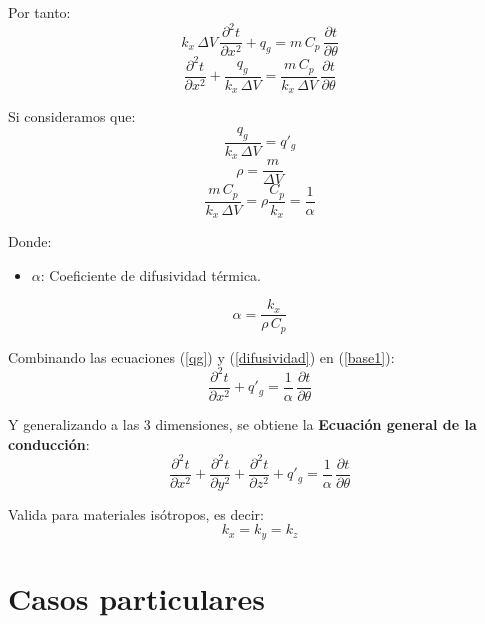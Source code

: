 Por tanto:
\begin{equation*}
    k_x\,\Delta V\,\frac{\partial^{2}t}{\partial x^2}+q_g
    =m\,C_p\,\frac{\partial t}{\partial\theta}
\end{equation*}
\begin{equation}
    \frac{\partial^{2}t}{\partial x^2}+\frac{q_g}{k_x\,\Delta V}
    =\frac{m\,C_p}{k_x\,\Delta V}\,\frac{\partial t}{\partial\theta}
    \label{base1}
\end{equation}

Si consideramos que:
\begin{equation}
    \frac{q_g}{k_x\,\Delta V}=q'_g
    \label{qg}
\end{equation}
\begin{equation*}
    \rho=\frac{m}{\Delta V}
\end{equation*}
\begin{equation}
    \frac{m\,C_p}{k_x\,\Delta V}=\rho\frac{C_p}{k_x}=\frac{1}{\alpha}
    \label{difusividad}
\end{equation}

Donde:
\begin{itemize}
    \item \emph{$\alpha$}: Coeficiente de difusividad térmica.
\end{itemize}

\begin{equation}
    \alpha=\frac{k_x}{\rho\,C_p}
    \label{alpha}
\end{equation}

Combinando las ecuaciones (\ref{qg}) y (\ref{difusividad}) en (\ref{base1}):
\begin{equation}
    \frac{\partial^{2}t}{\partial x^2}+q'_g
    =\frac{1}{\alpha}\,\frac{\partial t}{\partial\theta}
    \label{base2}
\end{equation}

Y generalizando a las 3 dimensiones, se obtiene la \textbf{Ecuación general de
la conducción}:
\begin{equation}
    \frac{\partial^{2}t}{\partial x^2}
    +\frac{\partial^{2}t}{\partial y^2}
    +\frac{\partial^{2}t}{\partial z^2}+q'_g
    =\frac{1}{\alpha}\,\frac{\partial t}{\partial\theta}
    \label{base3}
\end{equation}

Valida para materiales isótropos, es decir:
\begin{equation*}
    k_x=k_y=k_z
\end{equation*}

\section{Casos particulares}

